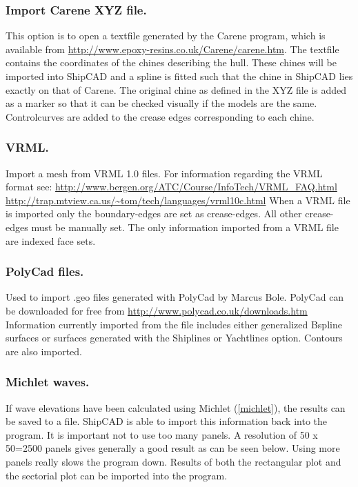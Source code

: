 \documentclass[12pt]{article}
\begin{document}
\subsubsection{Import Carene XYZ file.}
This option is to open a textfile generated by the Carene program,
which is available from
\url{http://www.epoxy-resins.co.uk/Carene/carene.htm}. The textfile
contains the coordinates of the chines describing the hull. These
chines will be imported into ShipCAD and a spline is fitted such that
the chine in ShipCAD lies exactly on that of Carene. The original
chine as defined in the XYZ file is added as a marker so that it can
be checked visually if the models are the same. Controlcurves are
added to the crease edges corresponding to each chine.

\subsubsection{VRML.}
Import a mesh from VRML 1.0 files. For information regarding the VRML
format see:
\url{http://www.bergen.org/ATC/Course/InfoTech/VRML_FAQ.html}
\url{http://trap.mtview.ca.us/~tom/tech/languages/vrml10c.html}
When a VRML file is imported only the boundary-edges are set as crease-edges. All other crease-
edges must be manually set. The only information imported from a VRML file are indexed face sets.

\subsubsection{PolyCad files.}
Used to import .geo files generated with PolyCad by Marcus
Bole. PolyCad can be downloaded for free
from \url{http://www.polycad.co.uk/downloads.htm} Information
currently imported from the file includes either generalized Bspline
surfaces or surfaces generated with the Shiplines or Yachtlines
option. Contours are also imported.

\subsubsection{Michlet waves.} \label{michlet-waves}
If wave elevations have been calculated using Michlet (\ref{michlet}),
the results can be saved to a file. ShipCAD is able to import this
information back into the program. It is important not to use too many
panels. A resolution of 50 x 50=2500 panels gives generally a good
result as can be seen below. Using more panels really slows the
program down. Results of both the rectangular plot and the sectorial
plot can be imported into the program.
\end{document}
